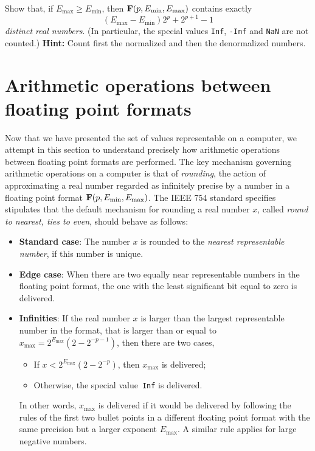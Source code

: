 \begin{exercise}
    Show that, if $E_{\max} \geq E_{\min}$, then $\mathbf F(p, E_{\min}, E_{\max})$ contains exactly
    \[
        (E_{\max} - E_{\min}) 2^{p} + 2^{p+1} - 1
    \]
    \emph{distinct real numbers}.
    (In particular, the special values \texttt{Inf}, \texttt{-Inf} and \texttt{NaN} are not counted.)
    \textbf{Hint:} Count first the normalized and then the denormalized numbers.
\end{exercise}

\section{Arithmetic operations between floating point formats}%
\label{sec:arithmetic_operations_between_floating_point_formats}

Now that we have presented the set of values representable on a computer,
we attempt in this section to understand precisely how arithmetic operations between floating point formats are performed.
The key mechanism governing arithmetic operations on a computer is that of \emph{rounding},
the action of approximating a real number regarded as infinitely precise by a number in a floating point format $\mathbf F (p, E_{\min}, E_{\max})$.
The IEEE 754 standard specifies stipulates that the default mechanism for rounding a real number $x$,
called \emph{round to nearest, ties to even},
should behave as follows:
\begin{itemize}
    \item
        \textbf{Standard case}:
        The number $x$ is rounded to the \emph{nearest representable number},
        if this number is unique.
    \item
        \textbf{Edge case}:
        When there are two equally near representable numbers in the floating point format,
        the one with the least significant bit equal to zero is delivered.
    \item
        \textbf{Infinities}:
        If the real number $x$ is larger than the largest representable number in the format,
        that is larger than or equal to $x_{\max} = 2^{E_{\max}} (2 - 2^{-p-1})$,
        then there are two cases,
        \begin{itemize}
            \item If $x < 2^{E_{\max}} (2 - 2^{-p})$, then $x_{\max}$ is delivered;
            \item Otherwise, the special value~\texttt{Inf} is delivered.
        \end{itemize}
        In other words, $x_{\max}$ is delivered if it would be delivered by following the rules of the first two bullet points
        in a different floating point format with the same precision but a larger exponent $E_{\max}$.
        A similar rule applies for large negative numbers.
\end{itemize}

